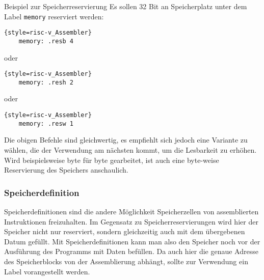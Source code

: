 {\begin{exampleblock}{Beispiel zur Speicherreservierung}
	Es sollen 32 Bit an Speicherplatz unter dem Label \texttt{memory} reserviert werden:\\
	\begin{lstlisting}{style=risc-v_Assembler}
	memory: .resb 4
	\end{lstlisting}
	oder
	\begin{lstlisting}{style=risc-v_Assembler}
	memory: .resh 2
	\end{lstlisting}
	oder
	\begin{lstlisting}{style=risc-v_Assembler}
	memory: .resw 1
	\end{lstlisting}
	Die obigen Befehle sind gleichwertig, es empfiehlt sich jedoch eine Variante zu wählen, die der Verwendung am nächsten kommt, um die Lesbarkeit zu erhöhen. Wird beispielsweise byte für byte gearbeitet, ist auch eine byte-weise Reservierung des Speichers anschaulich. 
\end{exampleblock}

\subsubsection{Speicherdefinition}

Speicherdefinitionen sind die andere Möglichkeit Speicherzellen von assemblierten Instruktionen freizuhalten. Im Gegensatz zu Speicherreservierungen wird hier der Speicher nicht nur reserviert, sondern gleichzeitig auch mit dem übergebenen Datum gefüllt. Mit Speicherdefinitionen kann man also den Speicher noch vor der Ausführung des Programms mit Daten befüllen. Da auch hier die genaue Adresse des Speicherblocks von der Assemblierung abhängt, sollte zur Verwendung ein Label vorangestellt werden.\\

}
